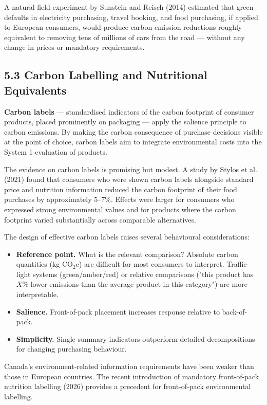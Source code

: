 \documentclass[12pt, letterpaper]{article}
\begin{document}
A natural field experiment by Sunstein and Reisch (2014) estimated that green defaults in electricity purchasing, travel booking, and food purchasing, if applied to European consumers, would produce carbon emission reductions roughly equivalent to removing tens of millions of cars from the road --- without any change in prices or mandatory requirements.


\subsection{5.3 Carbon Labelling and Nutritional Equivalents}


\textbf{Carbon labels} --- standardised indicators of the carbon footprint of consumer products, placed prominently on packaging --- apply the salience principle to carbon emissions. By making the carbon consequence of purchase decisions visible at the point of choice, carbon labels aim to integrate environmental costs into the System 1 evaluation of products.

The evidence on carbon labels is promising but modest. A study by Stylos et al. (2021) found that consumers who were shown carbon labels alongside standard price and nutrition information reduced the carbon footprint of their food purchases by approximately 5--7\%. Effects were larger for consumers who expressed strong environmental values and for products where the carbon footprint varied substantially across comparable alternatives.

The design of effective carbon labels raises several behavioural considerations:
\begin{itemize}
\item \textbf{Reference point.} What is the relevant comparison? Absolute carbon quantities (kg CO$_2$e) are difficult for most consumers to interpret. Traffic-light systems (green/amber/red) or relative comparisons ("this product has $X\%$ lower emissions than the average product in this category") are more interpretable.

\item \textbf{Salience.} Front-of-pack placement increases response relative to back-of-pack.

\item \textbf{Simplicity.} Single summary indicators outperform detailed decompositions for changing purchasing behaviour.
\end{itemize}

Canada's environment-related information requirements have been weaker than those in European countries. The recent introduction of mandatory front-of-pack nutrition labelling (2026) provides a precedent for front-of-pack environmental labelling.
\end{document}
